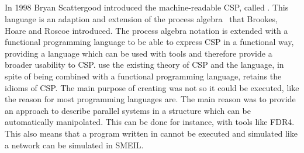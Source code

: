 
\subsection{\cspm{}}
In 1998 Bryan Scattergood introduced the machine-readable CSP, called \cspm. This language is an adaption and extension of the process algebra~\cite{Brookes1984} that Brookes, Hoare and Roscoe introduced.  The process algebra notation is extended with a functional programming language to be able to express CSP in a functional way, providing a language which can be used with tools and therefore provide a broader usability to CSP.
\cspm use the existing theory of CSP and the language, in spite of being combined with a functional programming language, retains the idioms of CSP.
The main purpose of creating \cspm was not so it could be executed, like the reason for most programming languages are. The main reason was to provide an approach to describe parallel systems in a structure which can be automatically manipolated. This can be done for instance, with tools like FDR4. This also means that a program written in \cspm cannot be executed and simulated like a network can be simulated in SMEIL. \\

